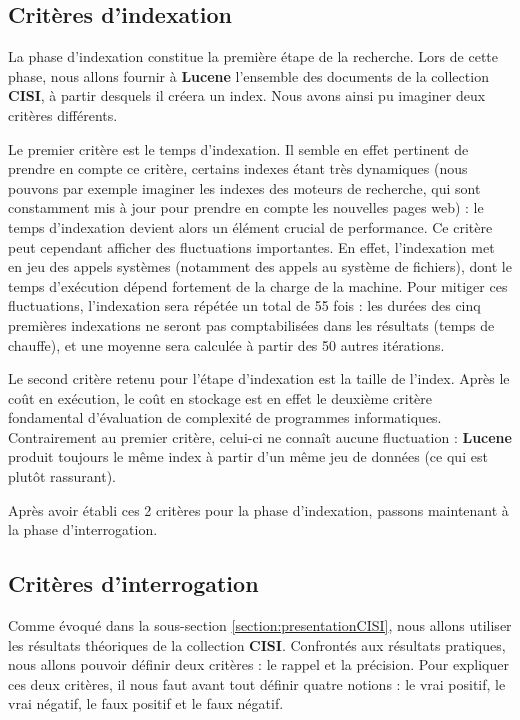 \subsection{Critères d'indexation}

La phase d’indexation constitue la première étape de la recherche. Lors de cette phase, nous allons fournir à \textbf{Lucene} l’ensemble des documents de la collection \textbf{CISI}, à partir desquels il créera un index. Nous avons ainsi pu imaginer deux critères différents.

Le premier critère est le temps d’indexation. Il semble en effet pertinent de prendre en compte ce critère, certains indexes étant très dynamiques (nous pouvons par exemple imaginer les indexes des moteurs de recherche, qui sont constamment mis à jour pour prendre en compte les nouvelles pages web) : le temps d’indexation devient alors un élément crucial de performance. Ce critère peut cependant afficher des fluctuations importantes. En effet, l’indexation met en jeu des appels systèmes (notamment des appels au système de fichiers), dont le temps d’exécution dépend fortement de la charge de la machine. Pour mitiger ces fluctuations, l’indexation sera répétée un total de 55 fois : les durées des cinq premières indexations ne seront pas comptabilisées dans les résultats (temps de chauffe), et une moyenne sera calculée à partir des 50 autres itérations.

Le second critère retenu pour l’étape d’indexation est la taille de l’index. Après le coût en exécution, le coût en stockage est en effet le deuxième critère fondamental d’évaluation de complexité de programmes informatiques. Contrairement au premier critère, celui-ci ne connaît aucune fluctuation : \textbf{Lucene} produit toujours le même index à partir d’un même jeu de données (ce qui est plutôt rassurant). 

Après avoir établi ces 2 critères pour la phase d’indexation, passons maintenant à la phase d’interrogation.

\subsection{Critères d’interrogation}

Comme évoqué dans la sous-section \ref{section:presentationCISI}, nous allons utiliser les résultats théoriques de la collection \textbf{CISI}. Confrontés aux résultats pratiques, nous allons pouvoir définir deux critères : le rappel et la précision. Pour expliquer ces deux critères, il nous faut avant tout définir quatre notions : le vrai positif, le vrai négatif, le faux positif et le faux négatif.

